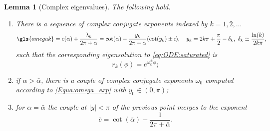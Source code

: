 \documentclass[reqno]{amsart}
\theoremstyle{definition} \newtheorem{definition}{Definition}[section]
\theoremstyle{definition} \newtheorem{remark}[definition]{Remark}
\theoremstyle{plain} \newtheorem{lemma}[definition]{Lemma}
\theoremstyle{plain} \newtheorem{proposition}[definition]{Proposition}
\theoremstyle{plain} \newtheorem{theorem}[definition]{Theorem}
\theoremstyle{plain} \newtheorem{corollary}[definition]{Corollary}
\theoremstyle{definition} \newtheorem{example}[definition]{Example}
\theoremstyle{plain} \newtheorem{claim}[clai]{Claim}
\theoremstyle{definition} \newtheorem{assumption}[definition]{Assumption}
\theoremstyle{definition} \newtheorem{observation}[definition]{Observation}
\newcommand{\1}{\mathbbm 1}
\renewcommand{\i}{\imath}
\numberwithin{equation}{section} %
\theoremstyle{plain} \newtheorem*{theorem*}{Theorem}
\theoremstyle{plain} \newtheorem{mthm}[maintheorem]{Main Theorem}
\theoremstyle{plain} \newtheorem*{mthm*}{Main Theorem}
\theoremstyle{plain} \newtheorem*{conjecture*}{Conjecture}
\theoremstyle{plain} \newtheorem{conjecture}[definition]{Conjecture}
\theoremstyle{plain} \newtheorem*{problem*}{Problem}
\begin{document}
\begin{lemma}[Complex eigenvalues]
\label{lem:complex:eigenvalues}
The following hold.
\begin{enumerate}
\item There is a sequence of complex conjugate exponents indexed by $k = 1,2,\dots$ 
\begin{equation}
\label{Equa:omega_exp}
\gls{omegak} = c(\alpha) + \frac{\lambda_k}{2\pi + \alpha} = \cot(\alpha) - \frac{y_k}{2\pi + \alpha} (\cot(y_k) \pm \i) , \quad y_k = 2k \pi + \frac{\pi}{2} - \delta_k, \ \delta_k \simeq \frac{\ln(k)}{2k\pi},
\end{equation}
such that the corresponding eigensolution to \eqref{eq:ODE:saturated} is
\begin{equation*}
r_k(\phi) = e^{\omega^\pm_k \phi};
\end{equation*}
\item if $\alpha > \bar \alpha$, there is a couple of complex conjugate exponents $\omega_0$ computed according to \eqref{Equa:omega_exp} with $y_0 \in (0,\pi)$;
\item for $\alpha = \bar \alpha$ the couple at $|y| < \pi$ of the previous point merges to the exponent
$$
\bar c = \cot(\bar \alpha) - \frac{1}{2\pi + \bar \alpha}.
$$
\end{enumerate}
\end{lemma}
\end{document}
